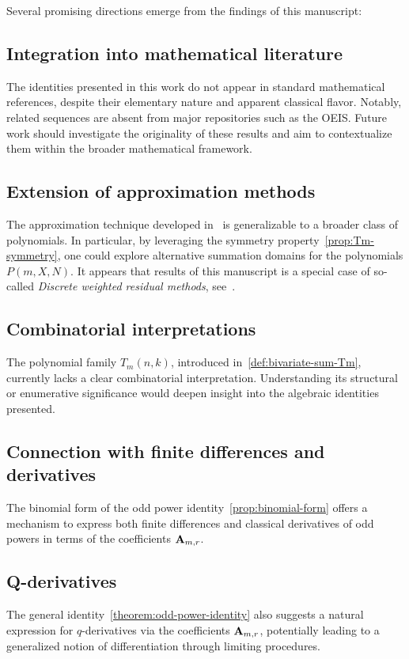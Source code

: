 Several promising directions emerge from the findings of this manuscript:

\subsection{Integration into mathematical literature}
\label{subsec:integration-into-mathematical-literature}
The identities presented in this work do not appear in standard mathematical references,
despite their elementary nature and apparent classical flavor.
Notably, related sequences are absent from major repositories such as the OEIS\@.
Future work should investigate the originality of these results and aim to contextualize
them within the broader mathematical framework.

\subsection{Extension of approximation methods}
\label{subsec:extension-of-approximation-methods}
The approximation technique developed in~\cite{kolosov2025efficient} is generalizable
to a broader class of polynomials.
In particular, by leveraging the symmetry property~\eqref{prop:Tm-symmetry},
one could explore alternative summation domains for the polynomials $P(m, X, N)$.
It appears that results of this manuscript is a special case of so-called
\textit{Discrete weighted residual methods}, see~\cite{neumann1977survey, neuman1977discrete}.

\subsection{Combinatorial interpretations}
\label{subsec:combinatorial-interpretations}
The polynomial family $T_m(n,k)$, introduced in~\eqref{def:bivariate-sum-Tm},
currently lacks a clear combinatorial interpretation.
Understanding its structural or enumerative significance would deepen insight into
the algebraic identities presented.

\subsection{Connection with finite differences and derivatives}
\label{subsec:connection-with-finite-differences-and-derivatives}
The binomial form of the odd power identity~\eqref{prop:binomial-form} offers a mechanism
to express both finite differences and classical derivatives of odd powers in terms
of the coefficients ${\mathbf{A}} \sb{m,r}$.

\subsection{Q-derivatives}
\label{subsec:q-derivative-representation}
The general identity~\eqref{theorem:odd-power-identity} also suggests a natural
expression for $q$-derivatives via the coefficients ${\mathbf{A}} \sb{m,r}$,
potentially leading to a generalized notion of differentiation through limiting procedures.

